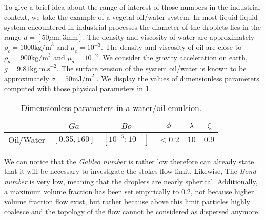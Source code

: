 To give a brief idea about the range of interest of those numbers in the industrial context, we take the example of a vegetal oil/water system.
In most liquid-liquid system encountered in industrial processes the diameter of the droplets lies in the range $d = [50 \mu \text{m}, 3 \text{mm}]$.
The density and viscosity of water are approximately $\rho_c = 1000 \text{kg/m}^3$ and $\mu_c = 10^{-3}$.
The density and viscosity of oil are close to $\rho_d = 900 \text{kg/m}^3$ and $\mu_d = 10^{-2}$.
We consider the gravity acceleration on earth, $g= 9.81 \text{kg.m.s}^{-2}$.
The surface tension of the system oil/water is known to be approximately $\sigma = 50 \text{mJ/m}^2$ \citep{de2015gouttes}. 
We display the values of dimensionless parameters computed with those physical parameters in \ref{tab:parameters_exp}.
\begin{table}[h!]
    \centering
    \caption{Dimensionless parameters in a water/oil emulsion.}
    \begin{tabular}{|c||c|c|c|c|c|}
        \hline&$Ga$&$Bo$&$\phi$&$\lambda$&$\zeta$\\ \hline
        \hline Oil/Water&$[0.35,160]$&$[10^{-5};10^{-1}]$&$<0.2$&$10$&$0.9$\\ \hline
    \end{tabular}
    \label{tab:parameters_exp}
\end{table}
We can notice that the \textit{Galileo number} is rather low therefore can already state that it will be necessary to investigate the stokes flow limit. 
Likewise, The \textit{Bond number} is very low, meaning that the droplets are nearly spherical.
Additionally, a maximum volume fraction has been set empirically to $0.2$, not because higher volume fraction flow exist, but rather because above this limit particles highly coalesce and the topology of the flow cannot be considered as dispersed anymore. 


